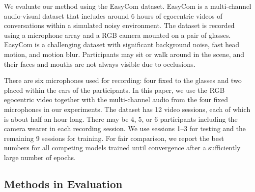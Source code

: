 \documentclass[10pt,twocolumn,letterpaper]{article}
\begin{document}
We evaluate our method using the EasyCom \cite{easycom} dataset. EasyCom is a multi-channel audio-visual dataset that includes around 
6 hours of 
egocentric videos of conversations within a simulated noisy environment. The dataset is recorded using a microphone array and a RGB camera mounted on a pair of 
glasses. EasyCom is a challenging dataset with significant background noise, fast head motion, and motion blur. 
Participants may sit or walk around in the scene, and 
their faces and mouths are
not always visible due to occlusions.
 
There are six microphones used for recording: four fixed to the glasses and 
two placed within the ears of the participants.
In this paper, we use the
RGB egocentric video together with the multi-channel audio from the four fixed microphones in our experiments.
The dataset has 12 video sessions, each of which is about half an hour long. There may be 4, 5, or 6 participants 
including the camera wearer in each recording session.
We use sessions 1--3 for testing and the remaining 9 sessions for training.
For fair comparison, we report the best numbers 
for all competing models trained until convergence after a sufficiently large number of epochs.

\subsection{Methods in Evaluation}
\vspace{-5pt}
\end{document}
